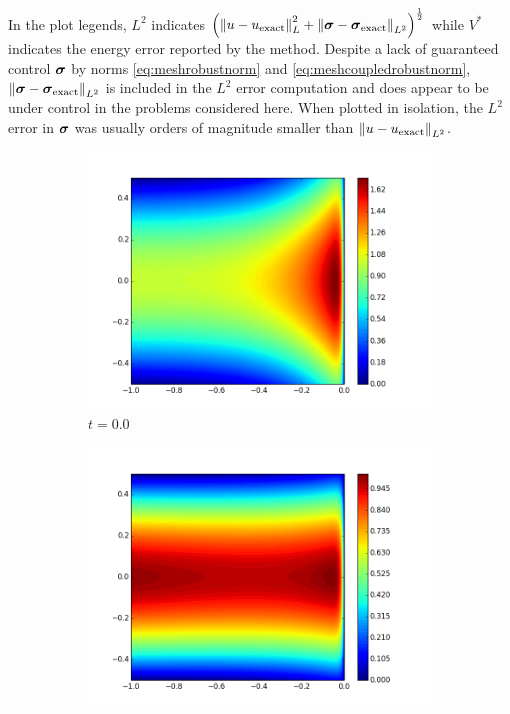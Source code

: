 \documentclass{article}
\begin{document}
In the plot legends, $L^2$ indicates $\left( \left\| u-u_\text{exact} \right\|_L^2+\left\| \boldsymbol\sigma-\boldsymbol\sigma_\text{exact} \right\|_{L^2} \right)^{\frac{1}{2}}$ 
while $V^*$ indicates the energy error reported by the method.
Despite a lack of guaranteed control $\boldsymbol\sigma$ by norms \eqref{eq:meshrobustnorm} and \eqref{eq:meshcoupledrobustnorm},
$\left\| \boldsymbol\sigma-\boldsymbol\sigma_\text{exact} \right\|_{L^2}$ is included in the $L^2$ error computation and does appear to be under control in the problems 
considered here. When plotted in isolation, the $L^2$ error in $\boldsymbol\sigma$ was usually orders of magnitude smaller than $\left\| u-u_\text{exact} \right\|_{L^2}$.

\begin{figure}[ht]
\centering
\begin{subfigure}[t]{0.32\textwidth}
\centering
\includegraphics[width=\textwidth]{Confusion/Robustness/2d_problem_t_=_00.png}
\caption{$t=0.0$}
\end{subfigure}
\begin{subfigure}[t]{0.32\textwidth}
\centering
\includegraphics[width=\textwidth]{Confusion/Robustness/2d_problem_t_=_05.png}

\end{subfigure}
\end{figure}
\end{document}

